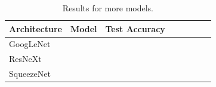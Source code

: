 \begin{table}[!htb]
\small
\begin{center}
\begin{tabular}{|p{1in}|c|c|c|c|c|c|c|}
\hline
Architecture 
 & Model
 & Test Accuracy \\
\hline
GoogLeNet & & \\
\hline
ResNeXt & & \\
\hline
SqueezeNet & & \\
\hline
\end{tabular}
\end{center}
\caption{Results for more models.
        }
\label{table:models_more}
\end{table}

\begin{figure}[!htb]
   \centering
   \subfigure[SqueezeNet]{
}
\end{figure}
